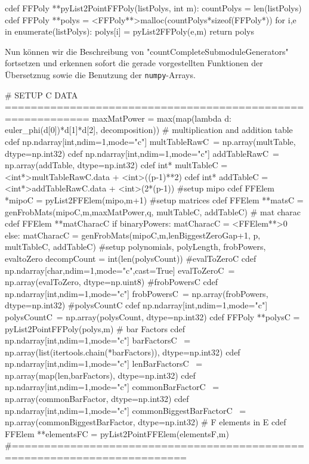 \begin{sagecode}[caption={Aus \url{../Sage/enumeratePCNs.spyx}},
  firstnumber=79]
cdef FFPoly **pyList2PointFFPoly(listPolys, int m):
    countPolys = len(listPolys)
    cdef FFPoly **polys = <FFPoly**>malloc(countPolys*sizeof(FFPoly*))
    for i,e in enumerate(listPolys):
        polys[i] = pyList2FFPoly(e,m)
    return polys
\end{sagecode}


Nun können wir die Beschreibung von "countCompleteSubmoduleGenerators"
fortsetzen und erkennen sofort die gerade vorgestellten Funktionen der
Übersetznug sowie die Benutzung der \texttt{numpy}-Arrays.

\begin{sagecode}[caption={\texttt{countCompleteSubmoduleGenerators}
  Fortsetzung (III)}, 
  firstnumber=196]
    # SETUP C DATA ===========================================================
    maxMatPower = max(map(lambda d: euler_phi(d[0])*d[1]*d[2], decomposition))
        # multiplication and addition table
    cdef np.ndarray[int,ndim=1,mode="c"] multTableRawC\
        = np.array(multTable, dtype=np.int32)
    cdef np.ndarray[int,ndim=1,mode="c"] addTableRawC\
        = np.array(addTable, dtype=np.int32)
    cdef int* multTableC = <int*>multTableRawC.data + <int>((p-1)**2)
    cdef int* addTableC = <int*>addTableRawC.data + <int>(2*(p-1))
        #setup mipo
    cdef FFElem *mipoC = pyList2FFElem(mipo,m+1)
       #setup matrices
    cdef FFElem **matsC  = genFrobMats(mipoC,m,maxMatPower,q,
            multTableC, addTableC)
        # mat charac
    cdef FFElem **matCharacC
    if binaryPowers:
        matCharacC = <FFElem**>0
    else:
        matCharacC = genFrobMats(mipoC,m,lenBiggestZeroGap+1,
                p, multTableC, addTableC)
    #setup polynomials, polyLength, frobPowers, evaltoZero
    decompCount = int(len(polysCount))
        #evalToZeroC
    cdef np.ndarray[char,ndim=1,mode="c",cast=True] evalToZeroC\
            = np.array(evalToZero, dtype=np.uint8)
        #frobPowersC
    cdef np.ndarray[int,ndim=1,mode="c"] frobPowersC\
            = np.array(frobPowers, dtype=np.int32)
        #polysCountC
    cdef np.ndarray[int,ndim=1,mode="c"] polysCountC\
            = np.array(polysCount, dtype=np.int32)
    cdef FFPoly **polysC = pyList2PointFFPoly(polys,m)
        # bar Factors
    cdef np.ndarray[int,ndim=1,mode="c"] barFactorsC \
        = np.array(list(itertools.chain(*barFactors)), dtype=np.int32)
    cdef np.ndarray[int,ndim=1,mode="c"] lenBarFactorsC \
        = np.array(map(len,barFactors), dtype=np.int32)
    cdef np.ndarray[int,ndim=1,mode="c"] commonBarFactorC \
        = np.array(commonBarFactor, dtype=np.int32)
    cdef np.ndarray[int,ndim=1,mode="c"] commonBiggestBarFactorC \
        = np.array(commonBiggestBarFactor, dtype=np.int32)
        # F elements in E
    cdef FFElem **elementsFC = pyList2PointFFElem(elementsF,m)
    #=========================================================================
\end{sagecode}

